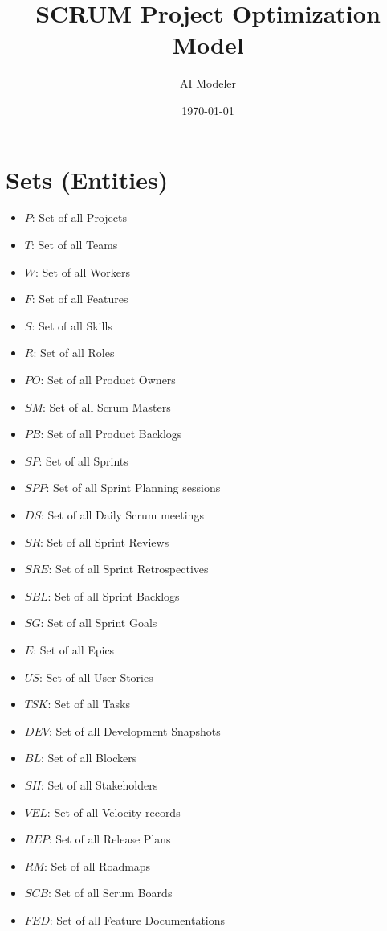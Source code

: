 \documentclass[11pt]{article}
\title{SCRUM Project Optimization Model}
\author{AI Modeler}
\date{\today}
\begin{document}
\maketitle
\tableofcontents
\newpage

\section{Sets (Entities)}
\begin{itemize}
    \item $P$: Set of all Projects
    \item $T$: Set of all Teams
    \item $W$: Set of all Workers
    \item $F$: Set of all Features
    \item $S$: Set of all Skills
    \item $R$: Set of all Roles
    \item $PO$: Set of all Product Owners
    \item $SM$: Set of all Scrum Masters
    \item $PB$: Set of all Product Backlogs
    \item $SP$: Set of all Sprints
    \item $SPP$: Set of all Sprint Planning sessions
    \item $DS$: Set of all Daily Scrum meetings
    \item $SR$: Set of all Sprint Reviews
    \item $SRE$: Set of all Sprint Retrospectives
    \item $SBL$: Set of all Sprint Backlogs
    \item $SG$: Set of all Sprint Goals
    \item $E$: Set of all Epics
    \item $US$: Set of all User Stories
    \item $TSK$: Set of all Tasks
    \item $DEV$: Set of all Development Snapshots
    \item $BL$: Set of all Blockers
    \item $SH$: Set of all Stakeholders
    \item $VEL$: Set of all Velocity records
    \item $REP$: Set of all Release Plans
    \item $RM$: Set of all Roadmaps
    \item $SCB$: Set of all Scrum Boards
    \item $FED$: Set of all Feature Documentations
\end{itemize}
\end{document}

